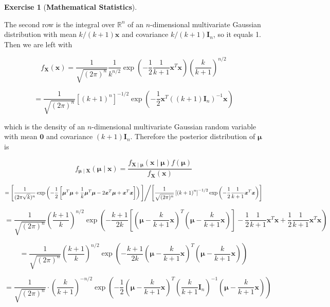 \documentclass{article}
\theoremstyle{definition}
\newtheorem{exercise}{Exercise}
\theoremstyle{definition}
\theoremstyle{definition}
\theoremstyle{definition}
\theoremstyle{definition}
\begin{document}
\begin{exercise}[\textbf{Mathematical Statistics}]
\begin{enumerate}[(a)]
The second row is the integral over \(\mathbb{R}^n\) of an \(n\)-dimensional multivariate Gaussian distribution with mean \(k/(k+1) \boldsymbol{x}\) and covariance \(k/(k+1) \boldsymbol{I}_n\), so it equals 1. Then we are left with

\[
f_{\boldsymbol{X}}(\boldsymbol{x})  =\frac{1}{\sqrt{(2 \pi )^n}}  \frac{1}{k^{n/2}}\exp \left(- \frac{1}{2} \frac{1}{k+1} \boldsymbol{x}^T \boldsymbol{x}   \right)\left( \frac{k}{k+1} \right)^{n/2}
\]

\[
=\frac{1}{\sqrt{(2 \pi )^n}} \left[ \left( k+1 \right)^n \right]^{-1/2} \exp \left(- \frac{1}{2} \boldsymbol{x}^T \left( (k+1) \boldsymbol{I}_n \right)^{-1} \boldsymbol{x}   \right)
\]

which is the density of an \(n\)-dimensional multivariate Gaussian random variable with mean \(\boldsymbol{0}\) and covariance \((k+1)\boldsymbol{I}_n\). Therefore the posterior distribution of \(\boldsymbol{\mu}\) is

\[
f_{\boldsymbol{\mu} \mid \boldsymbol{X}}(\boldsymbol{\mu} \mid \boldsymbol{x}) = \frac{f_{\boldsymbol{X} \mid \boldsymbol{\mu}}(\boldsymbol{x} \mid \boldsymbol{\mu}) f(\boldsymbol{\mu})}{f_{\boldsymbol{X}}(\boldsymbol{x})}
\]

\[
= \left[   \frac{1}{(2 \pi \sqrt{k})^n  }  \exp \left(- \frac{1}{2}\left[  \boldsymbol{\mu} ^T\boldsymbol{\mu}  + \frac{1}{k}\boldsymbol{\mu} ^T  \boldsymbol{\mu}  - 2 \boldsymbol{x} ^T\boldsymbol{\mu}   + \boldsymbol{x}^T \boldsymbol{x}  \right]  \right)  \Bigg] \middle/  \Bigg[ \frac{1}{\sqrt{(2 \pi )^n}} \left[ \left( k+1 \right)^n \right]^{-1/2} \exp \left(- \frac{1}{2} \frac{1}{k+1} \boldsymbol{x}^T \boldsymbol{x}   \right) \right]
\]

\[
=  \frac{1}{\sqrt{(2\pi)^n}} \left( \frac{k+1}{k} \right)^{n/2} \exp  \left(-  \frac{k+1}{2k} \left[  \left( \boldsymbol{\mu} -  \frac{k}{k+1}  \boldsymbol{x} \right) ^T\left( \boldsymbol{\mu} -  \frac{k}{k+1} \boldsymbol{x} \right) \right] - \frac{1}{2} \frac{1}{k+1}  \boldsymbol{x}^T \boldsymbol{x}  + \frac{1}{2} \frac{1}{k+1} \boldsymbol{x}^T \boldsymbol{x}\right)  
\]

\[
=  \frac{1}{\sqrt{(2\pi)^n}} \left( \frac{k+1}{k} \right)^{n/2} \exp  \left(-  \frac{k+1}{2k}  \left( \boldsymbol{\mu} -  \frac{k}{k+1}  \boldsymbol{x} \right) ^T\left( \boldsymbol{\mu} -  \frac{k}{k+1} \boldsymbol{x} \right)\right)  
\]

\[
=
 \frac{1}{\sqrt{(2 \pi)^n}}  \cdot \left( \frac{k}{k+1} \right)^{-n/2}   \exp \left(-  \frac{1}{2}   \left( \boldsymbol{\mu} -  \frac{k}{k+1}  \boldsymbol{x} \right) ^T \left( \frac{k}{k+1}\boldsymbol{I}_n \right)^{-1} \left( \boldsymbol{\mu} -  \frac{k}{k+1} \boldsymbol{x} \right)  \right)
 \]
 

\end{enumerate}
\end{exercise}
\end{document}

